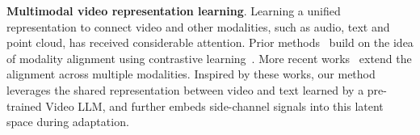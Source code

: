 

\medskip
\noindent \textbf{Multimodal video representation learning}.
Learning a unified representation to connect video and other modalities, such as audio, text and point cloud, has received considerable attention. Prior methods~\cite{luo2022clip4clip} build on the idea of modality alignment using contrastive learning~\cite{radford2021learningtransferablevisualmodels}. More recent works~\cite{chen2023valor, chen2023vast,zhang2023meta,girdhar2023imagebind,zhu2023languagebind} extend the alignment across multiple modalities. Inspired by these works, our method leverages the shared representation between video and text learned by a pre-trained Video LLM, and further embeds side-channel signals into this latent space during adaptation. %








